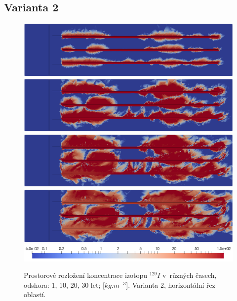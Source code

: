 \documentclass[11pt,a4paper]{article}
\begin{document}
\begin{onehalfspacing}
\subsection{Varianta 2}
\begin{figure}[H]
\centering
\includegraphics[width=16cm]{graphics/obr_ralek/var2/001a.png}
\includegraphics[width=16cm]{graphics/obr_ralek/var2/010a.png}
\includegraphics[width=16cm]{graphics/obr_ralek/var2/020a.png}
\includegraphics[width=16cm]{graphics/obr_ralek/var2/030a.png}
\includegraphics[width=16cm]{graphics/obr_ralek/var2/skala_var2.png}
\caption{Prostorové rozložení koncentrace izotopu $^{129}I$ v~různých časech, odshora: 1, 10, 20, 30 let; [$kg.m^{-3}$]. Varianta 2, horizontální řez oblastí.}
\end{figure}


\end{onehalfspacing}
\end{document}
